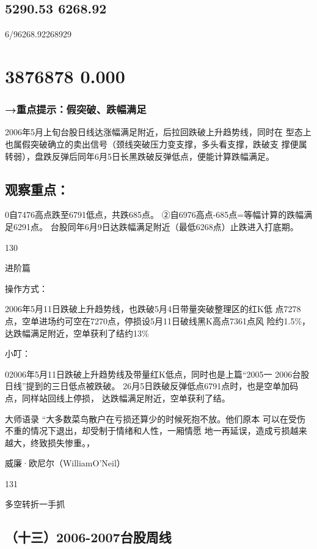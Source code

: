 \documentclass{article}
\begin{document}
\subsection{5290.53 6268.92}

6/96268.92268929

\section{3876878 0.000}

\subsubsection{→重点提示：假突破、跌幅满足}

2006年5月上旬台股日线达涨幅满足附近，后拉回跌破上升趋势线，同时在 型态上也属假突破确立的卖出信号（颈线突破压力变支撑，多头看支撑，跌破支 撑便属转弱），盘跌反弹后同年6月5日长黑跌破反弹低点，便能计算跌幅满足。

\subsection{观察重点：}

0自7476高点跌至6791低点，共跌685点。 ②自6976高点-685点=等幅计算的跌幅满足6291点。 台股同年6月9日达跌幅满足附近（最低6268点）止跌进入打底期。

130

\clearpage

进阶篇

操作方式：

2006年5月11日跌破上升趋势线，也跌破5月4日带量突破整理区的红K低 点7278点，空单进场约可空在7270点，停损设5月11日破线黑K高点7361点风 险约1.5\%，达跌幅满足附近，空单获利了结约13\%

小叮：

02006年5月11日跌破上升趋势线及带量红K低点，同时也是上篇“2005一 2006台股日线”提到的三日低点被跌破。 26月5日跌破反弹低点6791点时，也是空单加码点，同样站回线上停损， 达跌幅满足附近，空单获利了结。

大师语录 “大多数菜鸟散户在亏损还算少的时候死抱不放。他们原本 可以在受伤不重的情况下退出，却受制于情绪和人性，一厢情愿 地一再延误，造成亏损越来越大，终致损失惨重。，

威廉·欧尼尔（WilliamO'Neil）

131

\clearpage

多空转折一手抓

\subsection{（十三）2006-2007台股周线}
\end{document}
